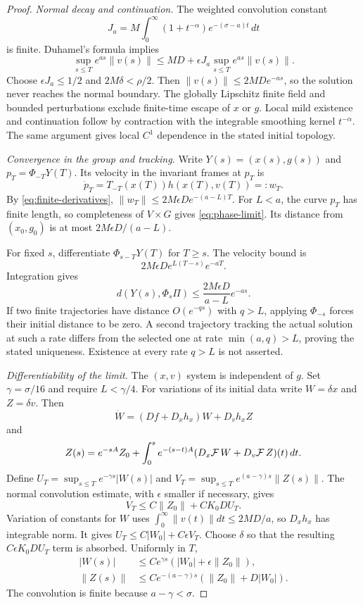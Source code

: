 \begin{proof}
\emph{Normal decay and continuation.}
The weighted convolution constant
\[
 J_a=M\int_0^\infty(1+t^{-\alpha})e^{-(\sigma-a)t}\,dt
\]
is finite. Duhamel's formula implies
\[
 \sup_{s\le T}e^{as}\|v(s)\|
 \le MD+\epsilon J_a\sup_{s\le T}e^{as}\|v(s)\|.
\]
Choose $\epsilon J_a\le1/2$ and $2M\delta<\rho/2$.
Then $\|v(s)\|\le2MD e^{-as}$, so the solution never
reaches the normal boundary. The globally Lipschitz finite
field and bounded perturbations exclude finite-time escape
of $x$ or $g$. Local mild existence and continuation follow
by contraction with the integrable smoothing kernel
$t^{-\alpha}$. The same argument gives local $C^1$
dependence in the stated initial topology.

\smallskip
\emph{Convergence in the group and tracking.}
Write $Y(s)=(x(s),g(s))$ and $p_T=\Phi_{-T}Y(T)$.
Its velocity in the invariant frames at $p_T$ is
\begin{equation}\label{eq:phase-velocity}
 \dot p_T=T_{-T}(x(T))h(x(T),v(T))=:w_T.
\end{equation}
By \eqref{eq:finite-derivatives},
$\|w_T\|\le2M\epsilon D e^{-(a-L)T}$.
For $L<a$, the curve $p_T$ has finite length, so
completeness of $V\times G$ gives \eqref{eq:phase-limit}.
Its distance from $(x_0,g_0)$ is at most
$2M\epsilon D/(a-L)$.

For fixed $s$, differentiate $\Phi_{s-T}Y(T)$ for
$T\ge s$. The velocity bound is
\[
 2M\epsilon D e^{L(T-s)}e^{-aT}.
\]
Integration gives
\[
 d(Y(s),\Phi_s\Pi)
       \le \frac{2M\epsilon D}{a-L}e^{-as}.
\]
If two finite trajectories have distance $O(e^{-qs})$
with $q>L$, applying $\Phi_{-s}$ forces their initial
distance to be zero. A second trajectory tracking the
actual solution at such a rate differs from the selected
one at rate $\min(a,q)>L$, proving the stated uniqueness.
Existence at every rate $q>L$ is not asserted.

\smallskip
\emph{Differentiability of the limit.}
The $(x,v)$ system is independent of $g$. Set
$\gamma=\sigma/16$ and require $L<\gamma/4$.
For variations of its initial data write $W=\delta x$
and $Z=\delta v$. Then
\[
 \dot W=(Df+D_xh_x)W+D_vh_xZ
\]
and
\[
 Z(s)=e^{-sA}Z_0+\int_0^s e^{-(s-t)A}
       (D_x\mathcal F\,W+D_v\mathcal F\,Z)(t)\,dt.
\]
Define
$U_T=\sup_{s\le T}e^{-\gamma s}|W(s)|$ and
$V_T=\sup_{s\le T}e^{(a-\gamma)s}\|Z(s)\|$.
The normal convolution estimate, with $\epsilon$ smaller
if necessary, gives
\[
 V_T\le C\|Z_0\|+CK_0D U_T.
\]
Variation of constants for $W$ uses
$\int_0^\infty\|v(t)\|dt\le2MD/a$, so
$D_xh_x$ has integrable norm. It gives
$U_T\le C|W_0|+C\epsilon V_T$.
Choose $\delta$ so that the resulting
$C\epsilon K_0D U_T$ term is absorbed. Uniformly in $T$,
\begin{equation}\label{eq:initial-variations}
 \begin{split}
 |W(s)|&\le Ce^{\gamma s}(|W_0|+\epsilon\|Z_0\|),\\
 \|Z(s)\|&\le Ce^{-(a-\gamma)s}(\|Z_0\|+D|W_0|).
 \end{split}
\end{equation}
The convolution is finite because $a-\gamma<\sigma$.


\end{proof}
